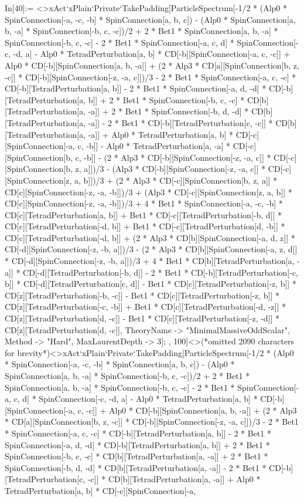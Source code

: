 In[40]:= <>xAct`xPlain`Private`TakePadding[ParticleSpectrum[-1/2 * (Alp0 * SpinConnection[-a, -c, -b] * SpinConnection[a, b, c]) - (Alp0 * SpinConnection[a, b, -a] * SpinConnection[-b, c, -c])/2 + 2 * Bet1 * SpinConnection[a, b, -a] * SpinConnection[-b, c, -c] - 2 * Bet1 * SpinConnection[-a, c, d] * SpinConnection[-c, -d, a] - Alp0 * TetradPerturbation[a, b] * CD[-b][SpinConnection[-a, c, -c]] + Alp0 * CD[-b][SpinConnection[a, b, -a]] + (2 * Alp3 * CD[a][SpinConnection[b, z, -c]] * CD[-b][SpinConnection[-z, -a, c]])/3 - 2 * Bet1 * SpinConnection[-a, c, -c] * CD[-b][TetradPerturbation[a, b]] - 2 * Bet1 * SpinConnection[-a, d, -d] * CD[-b][TetradPerturbation[a, b]] + 2 * Bet1 * SpinConnection[-b, c, -c] * CD[b][TetradPerturbation[a, -a]] + 2 * Bet1 * SpinConnection[-b, d, -d] * CD[b][TetradPerturbation[a, -a]] - 2 * Bet1 * CD[-b][TetradPerturbation[c, -c]] * CD[b][TetradPerturbation[a, -a]] + Alp0 * TetradPerturbation[a, b] * CD[-c][SpinConnection[-a, c, -b]] - Alp0 * TetradPerturbation[a, -a] * CD[-c][SpinConnection[b, c, -b]] - (2 * Alp3 * CD[-b][SpinConnection[-z, -a, c]] * CD[-c][SpinConnection[b, z, a]])/3 - (Alp3 * CD[-b][SpinConnection[-z, -a, c]] * CD[-c][SpinConnection[z, a, b]])/3 + (2 * Alp3 * CD[-c][SpinConnection[b, z, a]] * CD[c][SpinConnection[-z, -a, -b]])/3 + (Alp3 * CD[-c][SpinConnection[z, a, b]] * CD[c][SpinConnection[-z, -a, -b]])/3 + 4 * Bet1 * SpinConnection[-a, -c, -b] * CD[c][TetradPerturbation[a, b]] + Bet1 * CD[-c][TetradPerturbation[-b, d]] * CD[c][TetradPerturbation[-d, b]] + Bet1 * CD[-c][TetradPerturbation[d, -b]] * CD[c][TetradPerturbation[-d, b]] + (2 * Alp3 * CD[b][SpinConnection[-a, d, z]] * CD[-d][SpinConnection[-z, -b, a]])/3 - (2 * Alp3 * CD[b][SpinConnection[-a, z, d]] * CD[-d][SpinConnection[-z, -b, a]])/3 + 4 * Bet1 * CD[b][TetradPerturbation[a, -a]] * CD[-d][TetradPerturbation[-b, d]] - 2 * Bet1 * CD[-b][TetradPerturbation[-c, b]] * CD[-d][TetradPerturbation[c, d]] - Bet1 * CD[c][TetradPerturbation[-z, b]] * CD[z][TetradPerturbation[-b, -c]] - Bet1 * CD[c][TetradPerturbation[-z, b]] * CD[z][TetradPerturbation[-c, -b]] + Bet1 * CD[c][TetradPerturbation[-d, -z]] * CD[z][TetradPerturbation[d, -c]] - Bet1 * CD[c][TetradPerturbation[-z, -d]] * CD[z][TetradPerturbation[d, -c]], TheoryName -> "MinimalMassiveOddScalar", Method -> "Hard", MaxLaurentDepth -> 3]; , 100]<>(*omitted 2090 characters for brevity*)<>xAct`xPlain`Private`TakePadding[ParticleSpectrum[-1/2 * (Alp0 * SpinConnection[-a, -c, -b] * SpinConnection[a, b, c]) - (Alp0 * SpinConnection[a, b, -a] * SpinConnection[-b, c, -c])/2 + 2 * Bet1 * SpinConnection[a, b, -a] * SpinConnection[-b, c, -c] - 2 * Bet1 * SpinConnection[-a, c, d] * SpinConnection[-c, -d, a] - Alp0 * TetradPerturbation[a, b] * CD[-b][SpinConnection[-a, c, -c]] + Alp0 * CD[-b][SpinConnection[a, b, -a]] + (2 * Alp3 * CD[a][SpinConnection[b, z, -c]] * CD[-b][SpinConnection[-z, -a, c]])/3 - 2 * Bet1 * SpinConnection[-a, c, -c] * CD[-b][TetradPerturbation[a, b]] - 2 * Bet1 * SpinConnection[-a, d, -d] * CD[-b][TetradPerturbation[a, b]] + 2 * Bet1 * SpinConnection[-b, c, -c] * CD[b][TetradPerturbation[a, -a]] + 2 * Bet1 * SpinConnection[-b, d, -d] * CD[b][TetradPerturbation[a, -a]] - 2 * Bet1 * CD[-b][TetradPerturbation[c, -c]] * CD[b][TetradPerturbation[a, -a]] + Alp0 * TetradPerturbation[a, b] * CD[-c][SpinConnection[-a, 